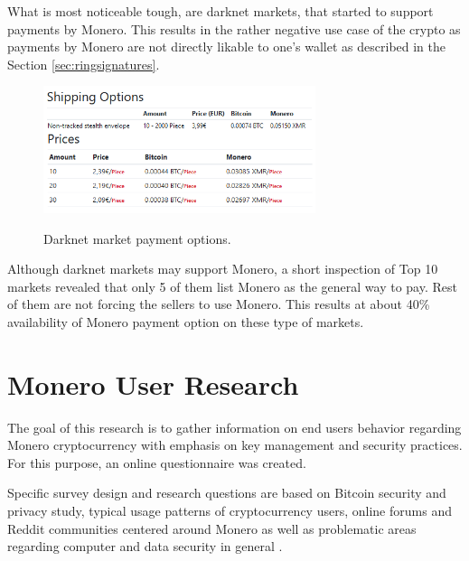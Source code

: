 \documentclass[
  printed, %
  table,   %
  lof,     %
  lot,     %
           oneside, color
]{fithesis3}
\begin{document}
What is most noticeable tough, are darknet markets, that started to support payments by Monero. This results in the rather negative use case of the crypto as payments by Monero are not directly likable to one's wallet as described in the Section \ref{sec:ringsignatures}.

\begin{figure}[H]
\begin{center}

    \vspace{-0.8em}
 \includegraphics[trim={0 1.8cm 0 0},clip,width=0.71\textwidth]{Screenshot_360.png}
    \caption{Darknet market payment options.}
    \vspace{-1.5em}
    \label{pic:withoutresdrawable}
\end{center}
    \end{figure}


Although darknet markets may support Monero, a short inspection of Top 10 markets revealed that only 5 of them list Monero as the general way to pay. Rest of them are not forcing the sellers to use Monero. This results at about 40\% availability of Monero payment option on these type of markets.


\chapter{Monero User Research}
\label{cha:monerousersurvey}
The goal of this research is to gather information on end users behavior regarding Monero cryptocurrency with emphasis on key management and security practices. For this purpose, an online questionnaire was created. 

Specific survey design and research questions are based on Bitcoin security and privacy study, typical usage patterns of cryptocurrency users, online forums and Reddit communities centered around Monero as well as problematic areas regarding computer and data security in general \cite{krombholz2016other}.
\end{document}
